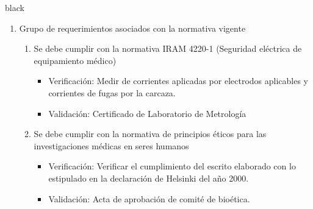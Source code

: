 \documentclass[11pt]{charter}
\begin{document}
\begin{consigna}{black}
\begin{enumerate}
\item Grupo de requerimientos asociados con la normativa vigente
	\begin{enumerate}
	\item Se debe cumplir con la normativa IRAM 4220-1 (Seguridad eléctrica de equipamiento médico)
	\begin{itemize}
		\item Verificación: Medir de corrientes aplicadas por electrodos aplicables y corrientes de fugas por la carcaza.
		\item Validación: Certificado de Laboratorio de Metrología\\
	\end{itemize}
	\item Se debe cumplir con la normativa de principios éticos para las investigaciones médicas en seres humanos
	\begin{itemize}
		\item Verificación: Verificar el cumplimiento del escrito elaborado con lo estipulado en la declaración de Helsinki del año 2000.
		\item Validación: Acta de aprobación de comité de bioética.\\
	\end{itemize}
	\end{enumerate}


\end{enumerate}
\end{consigna}
\end{document}
